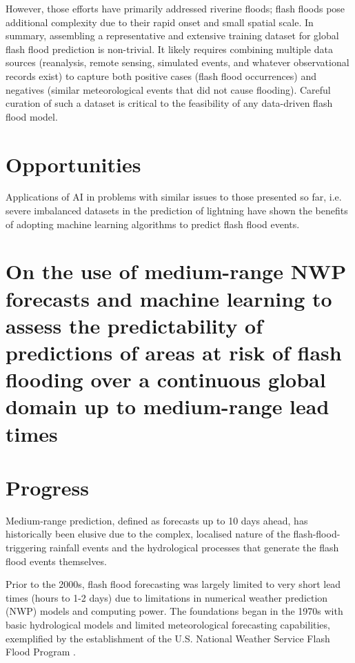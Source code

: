 However, those efforts have primarily addressed riverine floods; flash floods pose additional complexity due to their rapid onset and small spatial scale. In summary, assembling a representative and extensive training dataset for global flash flood prediction is non-trivial. It likely requires combining multiple data sources (reanalysis, remote sensing, simulated events, and whatever observational records exist) to capture both positive cases (flash flood occurrences) and negatives (similar meteorological events that did not cause flooding). Careful curation of such a dataset is critical to the feasibility of any data-driven flash flood model. 

\section{Opportunities}

Applications of AI in problems with similar issues to those presented so far, i.e. severe imbalanced datasets in the prediction of lightning \citep{Cavaiola_2024} have shown the benefits of adopting machine learning algorithms to predict flash flood events. 



\section{On the use of medium-range NWP forecasts and machine learning to assess the predictability of predictions of areas at risk of flash flooding over a continuous global domain up to medium-range lead times}

\section{Progress}
Medium-range prediction, defined as forecasts up to 10 days ahead, has historically been elusive due to the complex, localised nature of the flash-flood-triggering rainfall events and the hydrological processes that generate the flash flood events themselves. 

Prior to the 2000s, flash flood forecasting was largely limited to very short lead times (hours to 1-2 days) due to limitations in numerical weather prediction (NWP) models and computing power. The foundations began in the 1970s with basic hydrological models and limited meteorological forecasting capabilities, exemplified by the establishment of the U.S. National Weather Service Flash Flood Program \citep{Georgakakos_1987}.


